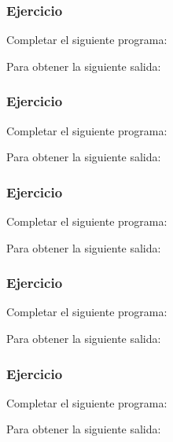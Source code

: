 \subsubsection{Ejercicio}
Completar el siguiente programa:
\lstset{inputencoding=utf8/latin1}

Para obtener la siguiente salida:
{\small
  \lstset{inputencoding=utf8/latin1}
  
}

\subsubsection{Ejercicio}
Completar el siguiente programa:
\lstset{inputencoding=utf8/latin1}

Para obtener la siguiente salida:
{\small
  \lstset{inputencoding=utf8/latin1}
  
}

\subsubsection{Ejercicio}
Completar el siguiente programa:
\lstset{inputencoding=utf8/latin1}

Para obtener la siguiente salida:
{\small
  \lstset{inputencoding=utf8/latin1}
  
}


\subsubsection{Ejercicio}
Completar el siguiente programa:
\lstset{inputencoding=utf8/latin1}

Para obtener la siguiente salida:
{\small
  \lstset{inputencoding=utf8/latin1}
  
}

\subsubsection{Ejercicio}
Completar el siguiente programa:
\lstset{inputencoding=utf8/latin1}

Para obtener la siguiente salida:
{\small
  \lstset{inputencoding=utf8/latin1}
  
}

